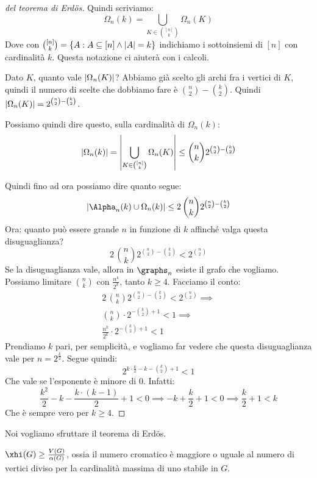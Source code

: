 \begin{proof}[del teorema di Erd\"os]
		Quindi scriviamo:
		\[
			\Omega_n (k) = \bigcup_{K \in \binom{[n]}{k}} \Omega_n (K)
		\]
		Dove con $\binom{[n]}{k} = \{ A : A \subseteq [n] \land \left\lvert{A}\right\rvert = k \}$ indichiamo i sottoinsiemi di $[n]$ con cardinalit\`a $k$.
		Questa notazione ci aiuter\`a con i calcoli.

		Dato $K$, quanto vale $\left\lvert{\Omega_n (K)}\right\rvert$?
		Abbiamo gi\`a scelto gli archi fra i vertici di $K$, quindi il numero di scelte che dobbiamo fare \`e $\binom{n}{2} - \binom{k}{2}$.
		Quindi $\left\lvert{\Omega_n (K)}\right\rvert = 2^{\binom{n}{2} - \binom{k}{2}}$.

		Possiamo quindi dire questo, sulla cardinalit\`a di $\Omega_n (k)$:
		\[
			\left\lvert{\Omega_n (k)}\right\rvert = \left\lvert{\bigcup_{K \in \binom{[n]}{k}} \Omega_n (K)}\right\rvert \le
			\binom{n}{k} 2^{\binom{n}{2} - \binom{k}{2}}
		\]

		Quindi fino ad ora possiamo dire quanto segue:
		\[
			\abs{\Alpha_n (k) \cup \Omega_n (k)} \le 2 \, \binom{n}{k} 2^{\binom{n}{2} - \binom{k}{2}}
		\]
		Ora: quanto pu\`o essere grande $n$ in funzione di $k$ affinch\'e valga questa disuguaglianza?
		\[
			2 \, \binom{n}{k} 2^{\binom{n}{2} - \binom{k}{2}} < 2^{\binom{n}{2}}
		\]
		Se la disuguaglianza vale, allora in $\graphs_n$ esiste il grafo che vogliamo.
		Possiamo limitare $\binom{n}{k}$ con $\frac{n^k}{2^k}$, tanto $k \ge 4$.
		Facciamo il conto:
		\begin{align*}
			2 \, \binom{n}{k} 2^{\binom{n}{2} - \binom{k}{2}} < 2^{\binom{n}{2}} \implies \\
			\binom{n}{k} \cdot 2^{- \binom{k}{2} + 1} < 1 \implies \\
			\frac{n^k}{2^k} \cdot 2^{- \binom{k}{2} + 1} < 1
		\end{align*}
		Prendiamo $k$ pari, per semplicit\`a, e vogliamo far vedere che questa disuguaglianza vale per $n = 2^{\frac{k}{2}}$.
		Segue quindi:
		\[
			2^{k \cdot \frac{k}{2} - k - \binom{k}{2} + 1} < 1
		\]
		Che vale se l'esponente \`e minore di $0$.
		Infatti:
		\[
			\frac{k^2}{2} - k - \frac{k \cdot (k - 1)}{2} + 1 < 0 \implies
			- k + \frac{k}{2} + 1 < 0 \implies
			\frac{k}{2} + 1 < k
		\]
		Che \`e sempre vero per $k \ge 4$.
	\end{proof}

	Noi vogliamo sfruttare il teorema di Erd\"os.
	\begin{oss}
		$\xhi (G) \ge \frac{V(G)}{\alpha(G)}$, ossia il numero cromatico \`e maggiore o uguale al numero di vertici diviso per la cardinalit\`a massima di uno stabile in $G$.
	\end{oss}

